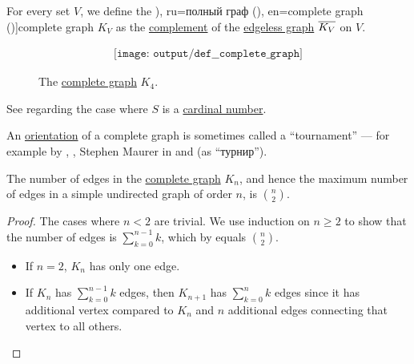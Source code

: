 \begin{definition}\label{def:complete_graph}\mimprovised
  For every set \( V \), we define the \term[bg=пълен граф (\cite[12]{Мирчев2001Графи}), ru=полный граф (\cite[10]{ЕмеличевИПр1990Графы}), en=complete graph (\cite[def. 1.3.1]{Knauer2011AlgGraphTheory})]{complete graph} \( K_V \) as the \hyperref[def:graph_complement]{complement} of the \hyperref[def:edgeless_graph]{edgeless graph} \( \oline{K_V} \) on \( V \).

  \begin{figure}[!ht]
    \begin{equation}\label{eq:fig:def:complete_graph/k4}
      \begin{aligned}
        \texttt{[image: output/def\_\_complete\_graph]}
      \end{aligned}
    \end{equation}
    \caption{The \hyperref[def:complete_graph]{complete graph} \( K_4 \).}\label{fig:def:complete_graph/k4}
  \end{figure}
\end{definition}
\begin{comments}
  \item See  regarding the case where \( S \) is a \hyperref[def:cardinal]{cardinal number}.

  \item An \hyperref[def:multigraph_orientation]{orientation} of a complete graph is sometimes called a \enquote{tournament} --- for example by , , Stephen Maurer in \cite[570]{Rosen1999DiscreteHandbook} and  (as \enquote{турнир}).
\end{comments}

\begin{proposition}\label{thm:complete_graph_edge_count}
  The number of edges in the \hyperref[def:complete_graph]{complete graph} \( K_n \), and hence the maximum number of edges in a simple undirected graph of order \( n \), is \( \binom n 2 \).
\end{proposition}
\begin{proof}
  The cases where \( n < 2 \) are trivial. We use induction on \( n \geq 2 \) to show that the number of edges is \( \sum_{k=0}^{n-1} k \), which by  equals \( \binom n 2 \).

  \begin{itemize}
    \item If \( n = 2 \), \( K_n \) has only one edge.
    \item If \( K_n \) has \( \sum_{k=0}^{n-1} k \) edges, then \( K_{n+1} \) has \( \sum_{k=0}^n k \) edges since it has additional vertex compared to \( K_n \) and \( n \) additional edges connecting that vertex to all others.
  \end{itemize}
\end{proof}

